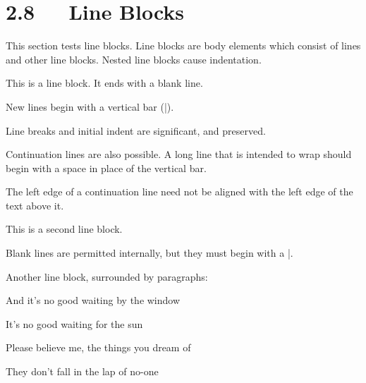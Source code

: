 \documentclass[a4paper]{memoir}
\newenvironment{DUlineblock}[1]{%
    \list{}{\setlength{\partopsep}{\parskip}
            \addtolength{\partopsep}{\baselineskip}
            \setlength{\topsep}{0pt}
            \setlength{\itemsep}{0.15\baselineskip}
            \setlength{\parsep}{0pt}
            \setlength{\leftmargin}{#1}}
    \raggedright
  }
  {\endlist}
\begin{document}
\section{2.8   Line Blocks}

This section tests line blocks.  Line blocks are body elements which
consist of lines and other line blocks.  Nested line blocks cause
indentation.

\begin{DUlineblock}{0em}
\item[] This is a line block.  It ends with a blank line.
\item[]
\begin{DUlineblock}{\DUlineblockindent}
\item[] New lines begin with a vertical bar (\textquotedbl{}|\textquotedbl{}).
\item[] Line breaks and initial indent are significant, and preserved.
\item[]
\begin{DUlineblock}{\DUlineblockindent}
\item[] Continuation lines are also possible.  A long line that is intended
to wrap should begin with a space in place of the vertical bar.
\end{DUlineblock}
\item[] The left edge of a continuation line need not be aligned with
the left edge of the text above it.
\end{DUlineblock}
\end{DUlineblock}

\begin{DUlineblock}{0em}
\item[] This is a second line block.
\item[] 
\item[] Blank lines are permitted internally, but they must begin with a \textquotedbl{}|\textquotedbl{}.
\end{DUlineblock}

Another line block, surrounded by paragraphs:

\begin{DUlineblock}{0em}
\item[] And it's no good waiting by the window
\item[] It's no good waiting for the sun
\item[] Please believe me, the things you dream of
\item[] They don't fall in the lap of no-one
\end{DUlineblock}
\end{document}
